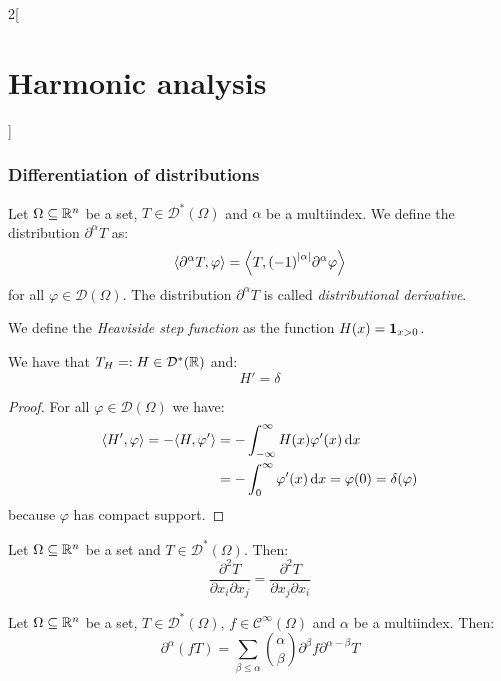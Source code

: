 \documentclass[../../../main_math.tex]{subfiles}
\begin{document}
\begin{multicols}{2}[\section{Harmonic analysis}]
  \subsubsection{Differentiation of distributions}
  \begin{definition}
    Let $\Omega\subseteq \mathbb{R}^n$ be a set, $T\in\mathcal{D}^*(\Omega)$ and $\alpha$ be a multiindex. We define the distribution $\partial^\alpha T$ as: $${\left\langle\partial^\alpha T,\varphi\right\rangle}={\left\langle T,{(-1)}^\abs{\alpha}\partial^\alpha\varphi\right\rangle}$$
    for all $\varphi\in\mathcal{D}(\Omega)$. The distribution $\partial^\alpha T$ is called \emph{distributional derivative}.
  \end{definition}
  \begin{definition}
    We define the \emph{Heaviside step function} as the function $H(x)=\boldsymbol{\mathrm{1}}_{x>0}$.
  \end{definition}
  \begin{proposition}
    We have that $T_{H}=:H\in\mathcal{D}^*(\mathbb{R})$ and: $$H'=\delta$$
  \end{proposition}
  \begin{proof}
    For all $\varphi\in\mathcal{D}(\Omega)$ we have:
    \begin{align*}
      {\left\langle H',\varphi\right\rangle}=-{\left\langle H,\varphi'\right\rangle} & =-\int_{-\infty}^\infty H(x)\varphi'(x)\dd{x}                  \\
                                             & =-\int_{0}^\infty\varphi'(x)\dd{x}= \varphi(0)=\delta(\varphi)
    \end{align*}
    because $\varphi$ has compact support.
  \end{proof}
  \begin{proposition}
    Let $\Omega\subseteq \mathbb{R}^n$ be a set and $T\in\mathcal{D}^*(\Omega)$. Then:
    $$
      \frac{\partial^2 T}{\partial x_i\partial x_j}=\frac{\partial^2 T}{\partial x_j\partial x_i}
    $$
  \end{proposition}
  \begin{proposition}
    Let $\Omega\subseteq \mathbb{R}^n$ be a set, $T\in\mathcal{D}^*(\Omega)$, $f\in \mathcal{C}^\infty(\Omega)$ and $\alpha$ be a multiindex. Then:
    $$
      \partial^\alpha (fT)=\sum_{\beta\leq \alpha}\binom{\alpha}{\beta}\partial^\beta f\partial^{\alpha-\beta} T
    $$
  \end{proposition}

\end{multicols}
\end{document}
